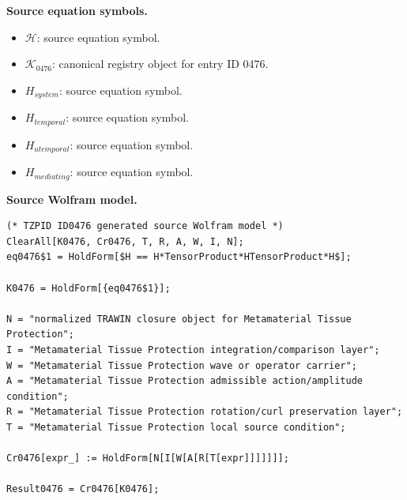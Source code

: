 \begin{minipage}[t]{0.49\linewidth}
\begingroup
\small
\raggedright
\textbf{Source equation symbols.}\par
\begin{itemize}[leftmargin=1.35em,itemsep=1pt,topsep=1pt,parsep=0pt]
    \item $\mathcal{H}$: source equation symbol.
    \item $\mathcal{K}_{0476}$: canonical registry object for entry ID 0476.
    \item $H_{system}$: source equation symbol.
    \item $H_{temporal}$: source equation symbol.
    \item $H_{atemporal}$: source equation symbol.
    \item $H_{mediating}$: source equation symbol.
\end{itemize}
\endgroup
\end{minipage}\hfill
\begin{minipage}[t]{0.47\linewidth}
\begingroup
\scriptsize
\raggedright
\textbf{Source Wolfram model.}\par
\begin{Verbatim}[fontsize=\tiny,breaklines=true,breakanywhere=true]
(* TZPID ID0476 generated source Wolfram model *)
ClearAll[K0476, Cr0476, T, R, A, W, I, N];
eq0476$1 = HoldForm[$H == H*TensorProduct*HTensorProduct*H$];

K0476 = HoldForm[{eq0476$1}];

N = "normalized TRAWIN closure object for Metamaterial Tissue Protection";
I = "Metamaterial Tissue Protection integration/comparison layer";
W = "Metamaterial Tissue Protection wave or operator carrier";
A = "Metamaterial Tissue Protection admissible action/amplitude condition";
R = "Metamaterial Tissue Protection rotation/curl preservation layer";
T = "Metamaterial Tissue Protection local source condition";

Cr0476[expr_] := HoldForm[N[I[W[A[R[T[expr]]]]]]];

Result0476 = Cr0476[K0476];
\end{Verbatim}
\endgroup
\end{minipage}

